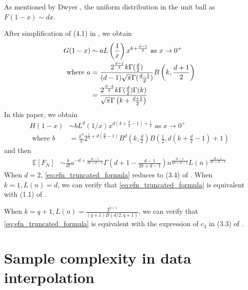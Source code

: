 \documentclass{aptpub}
\def\E{\mathbb{E}}
\begin{document}
As mentioned by Dwyer \cite{dwyer1991convex}, the uniform distribution
in the unit ball as $F(1-x) \sim dx$.

After simplification of (4.1) in \cite{dwyer1991convex}, we obtain
\begin{align}
    G(1-x) &\sim a
    L\left(\frac{1}{x} \right)
    x^{k+\frac{d-1}{2}} \textrm{ as } x \to 0^+ \\
    \textrm{ where } a &=\frac{2^{\frac{d-1}{2}} k \Gamma(\frac{d}{2})}
    {(d-1) \sqrt{\pi} \Gamma(\frac{d-1}{2})}
    B\left(k, \frac{d+1}{2}\right) \notag \\
    &= \frac{2^{\frac{d-3}{2}} k \Gamma(\frac{d}{2})\Gamma(k)}
    {\sqrt{\pi} \Gamma\left(k+\frac{d+1}{2}\right)}
\end{align}
In this paper, we obtain
\begin{align}
     H(1-x)  & \sim b
     L^d(1/x) x^{d(k+\frac{d}{2}-1)+\frac{1}{2}} 
     \textrm{ as } x \to 0^+ \\
     \textrm{ where } b &=  \frac{k^d}{\pi}
     2^{\frac{1}{2} + d(\frac{d}{2}-1)} B^d(k, \frac{d}{2})
     B\left( \frac{1}{2},
     d(k+\frac{d}{2} -1)+1 \right)
 \end{align}
and then
 \begin{align}\label{eq:efn_truncated_formula}
     \E[F_N] &\sim \frac{b}{d!}a^{-d+\frac{d-1}{2k+d-1}}
     \Gamma\left(d+1-\frac{d-1}{2k+d-1}\right)n^{\frac{d-1}{2k+d-1}}
     L(n)
     ^{\frac{d-1}{2k+d-1}}
 \end{align}
 When $d=2$, \eqref{eq:efn_truncated_formula} reduces to (3.4) of \cite{carnal1970konvexe}.
 When $k=1, L(n)=d$, we can verify that
 \eqref{eq:efn_truncated_formula} is equivalent with (1.1)
 of \cite{raynaud1970enveloppe}.
 
 When $k=q+1, L(n)=\frac{2^{q+1}}{(q+1)B(d/2,q+1)}$,
 we can verify that
 \eqref{eq:efn_truncated_formula} is equivalent with the expression of $c_3$
 in (3.3) of \cite{affentranger1991convex}.
 
\section{Sample complexity in data interpolation}\label{sec:sample_complexity}


\end{document}
